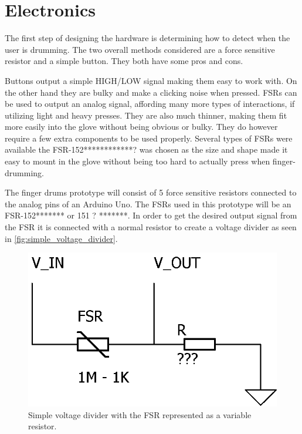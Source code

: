 \section{Electronics}
\label{electronics}
The first step of designing the hardware is determining how to detect when the user is drumming. The two overall methods considered are a force sensitive resistor and a simple button. They both have some pros and cons. 

Buttons output a simple HIGH/LOW signal making them easy to work with. On the other hand they are bulky and make a clicking noise when pressed.
FSRs can be used to output an analog signal, affording many more types of interactions, if utilizing light and heavy presses. They are also much thinner, making them fit more easily into the glove without being obvious or bulky. They do however require a few extra components to be used properly. Several types of FSRs were available the FSR-152************? was chosen as the size and shape made it easy to mount in the glove without being too hard to actually press when finger-drumming.
\blankline 

The finger drums prototype will consist of 5 force sensitive resistors connected to the analog pins of an Arduino Uno. The FSRs used in this prototype will be an FSR-152******* or 151 ? *******. In order to get the desired output signal from the FSR it is connected with a normal resistor to create a voltage divider as seen in \autoref{fig:simple_voltage_divider}. 
\begin{figure}[H]
\centering
\includegraphics[scale=1.5]{Figure/simple_voltage_divider.png}
\caption{Simple voltage divider with the FSR represented as a variable resistor. }
\label{fig:simple_voltage_divider}
\end{figure}

